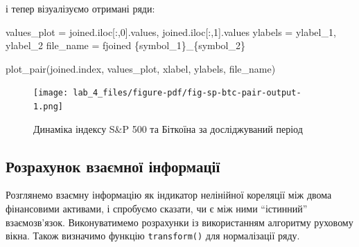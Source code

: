 \documentclass[
  letterpaper,
]{report}
\newenvironment{Shaded}{\begin{snugshade}}{\end{snugshade}}
\newcommand{\DecValTok}[1]{\textcolor[rgb]{0.68,0.00,0.00}{#1}}
\newcommand{\NormalTok}[1]{\textcolor[rgb]{0.00,0.23,0.31}{#1}}
\newcommand{\OperatorTok}[1]{\textcolor[rgb]{0.37,0.37,0.37}{#1}}
\newcommand{\SpecialCharTok}[1]{\textcolor[rgb]{0.37,0.37,0.37}{#1}}
\newcommand{\SpecialStringTok}[1]{\textcolor[rgb]{0.13,0.47,0.30}{#1}}
\begin{document}
і тепер візуалізуємо отримані ряди:

\begin{Shaded}
\begin{Highlighting}[]
\NormalTok{values\_plot }\OperatorTok{=}\NormalTok{ joined.iloc[:,}\DecValTok{0}\NormalTok{].values, joined.iloc[:,}\DecValTok{1}\NormalTok{].values}
\NormalTok{ylabels }\OperatorTok{=}\NormalTok{ ylabel\_1, ylabel\_2}
\NormalTok{file\_name }\OperatorTok{=} \SpecialStringTok{f\textquotesingle{}joined }\SpecialCharTok{\{}\NormalTok{symbol\_1}\SpecialCharTok{\}}\SpecialStringTok{\_}\SpecialCharTok{\{}\NormalTok{symbol\_2}\SpecialCharTok{\}}\SpecialStringTok{\textquotesingle{}}
\end{Highlighting}
\end{Shaded}

\begin{Shaded}
\begin{Highlighting}[]
\NormalTok{plot\_pair(joined.index, values\_plot, xlabel, ylabels, file\_name)}
\end{Highlighting}
\end{Shaded}

\begin{figure}[H]

{\centering \texttt{[image: lab\_4\_files/figure-pdf/fig-sp-btc-pair-output-1.png]}

}

\caption{\label{fig-sp-btc-pair}Динаміка індексу S\&P 500 та Біткоїна за
досліджуваний період}

\end{figure}

\hypertarget{ux440ux43eux437ux440ux430ux445ux443ux43dux43eux43a-ux432ux437ux430ux454ux43cux43dux43eux457-ux456ux43dux444ux43eux440ux43cux430ux446ux456ux457}{%
\subsection{Розрахунок взаємної
інформації}\label{ux440ux43eux437ux440ux430ux445ux443ux43dux43eux43a-ux432ux437ux430ux454ux43cux43dux43eux457-ux456ux43dux444ux43eux440ux43cux430ux446ux456ux457}}

Розглянемо взаємну інформацію як індикатор нелінійної кореляції між
двома фінансовими активами, і спробуємо сказати, чи є між ними
``істинний'' взаємозв'язок. Виконуватимемо розрахунки із використанням
алгоритму руховому вікна. Також визначимо функцію \texttt{transform()}
для нормалізації ряду.
\end{document}
